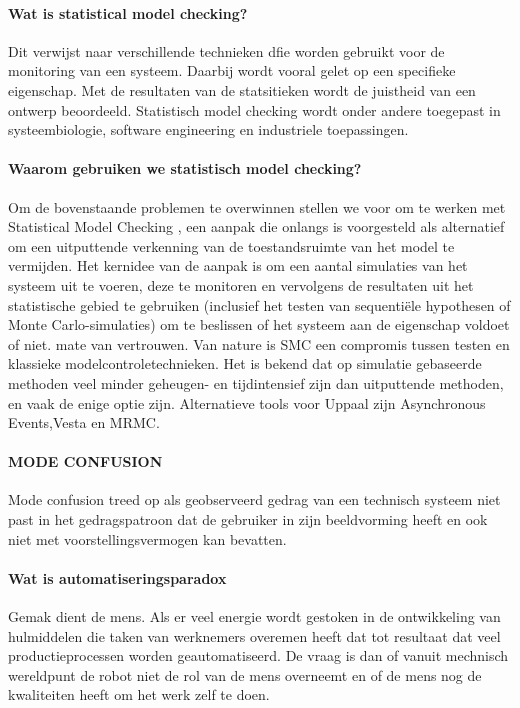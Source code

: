 \documentclass{article}
\begin{document}
	
	
	\paragraph{Wat is statistical model checking?}
	Dit verwijst naar verschillende technieken dfie worden gebruikt voor de monitoring van een systeem. Daarbij wordt vooral gelet op een specifieke eigenschap. Met de resultaten van de statsitieken wordt de juistheid van een ontwerp beoordeeld. Statistisch model checking wordt onder andere toegepast in systeembiologie, software engineering en industriele toepassingen.
	\cite{inriaStatsMoodCheck}
	\cite{ buddeModelChecker}
	
	\paragraph{Waarom gebruiken we statistisch model checking?}
	Om de bovenstaande problemen te overwinnen stellen we voor om te werken met Statistical Model Checking , een aanpak die onlangs is voorgesteld als alternatief om een uitputtende verkenning van de toestandsruimte van het model te vermijden. Het kernidee van de aanpak is om een aantal simulaties van het systeem uit te voeren, deze te monitoren en vervolgens de resultaten uit het statistische gebied te gebruiken (inclusief het testen van sequentiële hypothesen of Monte Carlo-simulaties) om te beslissen of het systeem aan de eigenschap voldoet of niet. mate van vertrouwen. Van nature is SMC een compromis tussen testen en klassieke modelcontroletechnieken. Het is bekend dat op simulatie gebaseerde methoden veel minder geheugen- en tijdintensief zijn dan uitputtende methoden, en vaak de enige optie zijn.
	\cite{inriaStatsMoodCheck}Alternatieve tools voor Uppaal zijn Asynchronous Events,Vesta en MRMC.
	
	
	\paragraph{MODE CONFUSION }
	Mode confusion treed op als geobserveerd gedrag van een technisch systeem niet past in het gedragspatroon dat de gebruiker in zijn beeldvorming heeft  en ook niet met voorstellingsvermogen kan bevatten.
	
	\paragraph{Wat is automatiseringsparadox}
	Gemak dient de mens. Als er veel energie wordt gestoken in de ontwikkeling van hulmiddelen die taken van werknemers overemen heeft dat tot resultaat dat veel productieprocessen worden geautomatiseerd. De vraag is dan of vanuit mechnisch wereldpunt de robot niet de rol van de mens overneemt en of de mens nog de kwaliteiten heeft om het werk zelf te doen.
	\cite{bicker21102016automatiseringsparadox}
	\cite{vseautoparadox}
	\cite{blogxot21112016slimapparaat}
	
\end{document}
